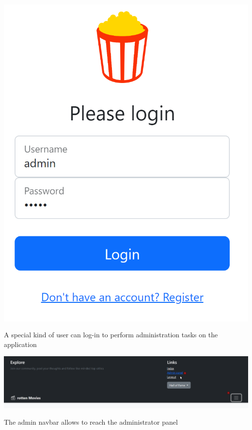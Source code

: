 \begin{center}
\includegraphics[scale=0.45]{../../../images/user_manual/admin_login.png} 
\end{center}
\vspace{5pt}

A special kind of user can log-in to perform administration tasks on the application

\begin{center}
\includegraphics[scale=0.45]{../../../images/user_manual/admin_navbar.png} 

\end{center}
\vspace{5pt}
The admin navbar allows to reach the administrator panel

